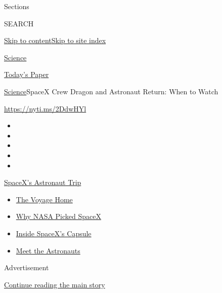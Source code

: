 Sections

SEARCH

\protect\hyperlink{site-content}{Skip to
content}\protect\hyperlink{site-index}{Skip to site index}

\href{https://www.nytimes.com/section/science}{Science}

\href{https://myaccount.nytimes.com/auth/login?response_type=cookie\&client_id=vi}{}

\href{https://www.nytimes.com/section/todayspaper}{Today's Paper}

\href{/section/science}{Science}\textbar{}SpaceX Crew Dragon and
Astronaut Return: When to Watch

\url{https://nyti.ms/2DdwHYl}

\begin{itemize}
\item
\item
\item
\item
\item
\end{itemize}

\href{https://www.nytimes.com/2020/08/01/science/nasa-spacex-astronauts.html?action=click\&pgtype=Article\&state=default\&region=TOP_BANNER\&context=storylines_menu}{SpaceX's
Astronaut Trip}

\begin{itemize}
\tightlist
\item
  \href{https://www.nytimes.com/2020/08/01/science/nasa-spacex-astronauts.html?action=click\&pgtype=Article\&state=default\&region=TOP_BANNER\&context=storylines_menu}{The
  Voyage Home}
\item
  \href{https://www.nytimes.com/2020/05/26/science/spacex-launch-nasa.html?action=click\&pgtype=Article\&state=default\&region=TOP_BANNER\&context=storylines_menu}{Why
  NASA Picked SpaceX}
\item
  \href{https://www.nytimes.com/interactive/2020/05/26/science/spacex-nasa.html?action=click\&pgtype=Article\&state=default\&region=TOP_BANNER\&context=storylines_menu}{Inside
  SpaceX's Capsule}
\item
  \href{https://www.nytimes.com/2020/05/27/science/bob-behnken-doug-hurley.html?action=click\&pgtype=Article\&state=default\&region=TOP_BANNER\&context=storylines_menu}{Meet
  the Astronauts}
\end{itemize}

Advertisement

\protect\hyperlink{after-top}{Continue reading the main story}

